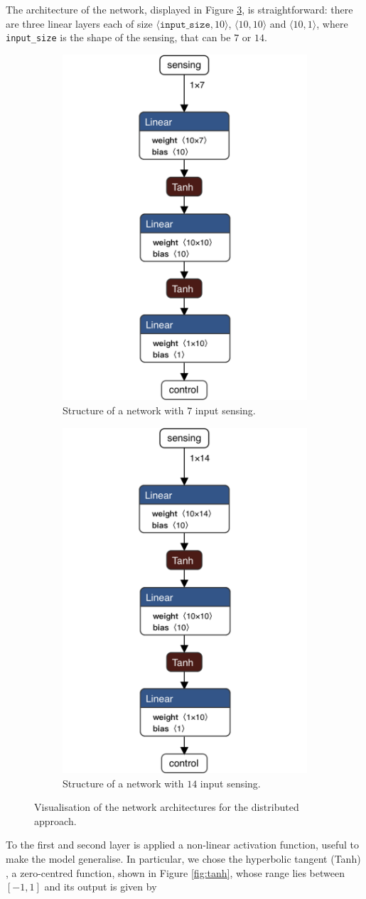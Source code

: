 The architecture of the network, displayed in Figure 
\ref{fig:singlenetdistributed1}, is straightforward: there are three linear 
layers each of size $\langle\mathtt{input\_size}, 10\rangle$,  $\langle 10, 
10\rangle$ and $\langle 10, 1\rangle$, where \texttt{input\_size} is the 
shape of the sensing, that can be $7$ or $14$.

\begin{figure}[htb]
	\centering
	\begin{subfigure}[h]{0.495\textwidth}
		\centering
		\includegraphics[width=.3\textwidth]{contents/images/task1distributed@4x}%
		\caption{Structure of a network with $7$ input sensing.}
		\label{fig:singlenet7distributed1}
	\end{subfigure}
	\hfill
	\begin{subfigure}[h]{0.495\textwidth}
		\centering
		\includegraphics[width=.3\textwidth]{contents/images/task1distributed_all@4x}
		\caption{Structure of a network with $14$ input sensing.}
		\label{fig:singlenet14distributed1}
	\end{subfigure}
	\caption{Visualisation of the network architectures for the distributed 
		approach.}
	\label{fig:singlenetdistributed1}
\end{figure}

To the first and second layer is applied a non-linear activation function, 
useful to make the model generalise. 
In particular, we chose the hyperbolic tangent (Tanh) 
\cite[see][]{kalman1992tanh}, a zero-centred function, shown in Figure 
\ref{fig:tanh}, whose range lies between $[-1, 1]$ and its output is given by

